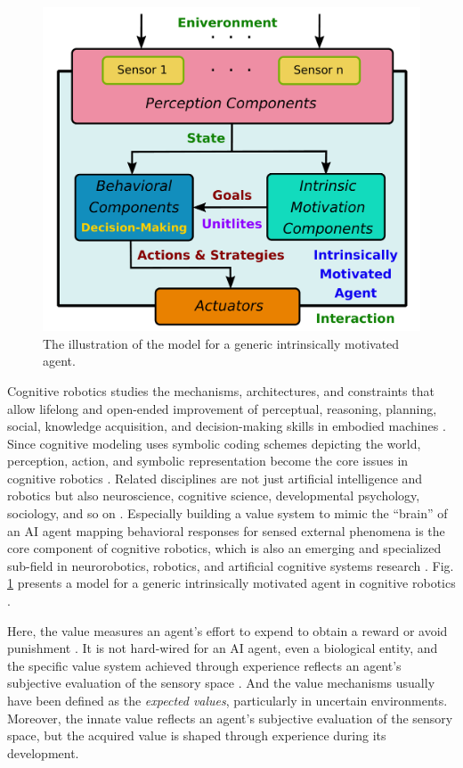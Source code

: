 \documentclass[letterpaper]{article} %
\begin{document}
\begin{figure}[t]
    \centering
    \includegraphics[width=\linewidth]{./AuthorKit24/figures/innate.pdf}
    \caption{The illustration of the model for a generic intrinsically motivated agent.}
    \label{fig:generic_motivated}
\end{figure}

Cognitive robotics studies the mechanisms, architectures, and constraints that allow lifelong and open-ended improvement of perceptual, reasoning, planning, social, knowledge acquisition, and decision-making skills in embodied machines \cite{merrick2017value}. Since cognitive modeling uses symbolic coding schemes depicting the world, perception, action, and symbolic representation become the core issues in cognitive robotics \cite{yang2019self,yang2020hierarchical,yang2021can}. Related disciplines are not just artificial intelligence and robotics but also neuroscience, cognitive science, developmental psychology, sociology, and so on \cite{asada2009cognitive}. Especially building a value system to mimic the ``brain'' of an AI agent mapping behavioral responses for sensed external phenomena is the core component of cognitive robotics, which is also an emerging and specialized sub-field in neurorobotics, robotics, and artificial cognitive systems research \cite{yang2023understanding}. Fig. \ref{fig:generic_motivated} presents a model for a generic intrinsically motivated agent in cognitive robotics \cite{merrick2013novelty}.

Here, the value measures an agent's effort to expend to obtain a reward or avoid punishment \cite{yang2020needs}. It is not hard-wired for an AI agent, even a biological entity, and the specific value system achieved through experience reflects an agent's subjective evaluation of the sensory space \cite{10.1145/3555776.3577642}. And the value mechanisms usually have been defined as the {\it expected values}, particularly in uncertain environments. Moreover, the innate value reflects an agent's subjective evaluation of the sensory space, but the acquired value is shaped through experience during its development.
\end{document}
